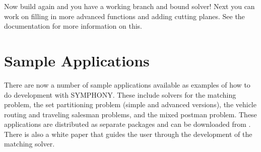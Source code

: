 Now build again and you have a working branch and bound solver! Next you can
work on filling in more advanced functions and adding cutting planes. See the
documentation for more information on this.

\section{Sample Applications}

There are now a number of sample applications available as examples of how
to do development with SYMPHONY. These include solvers for the matching
problem, the set partitioning problem (simple and advanced versions), the 
vehicle routing and traveling salesman problems, and the mixed postman
problem. These applications are distributed as separate packages and can be
downloaded from       
\texttt{}. There is also a white paper that guides the
user through the development of the matching solver.
